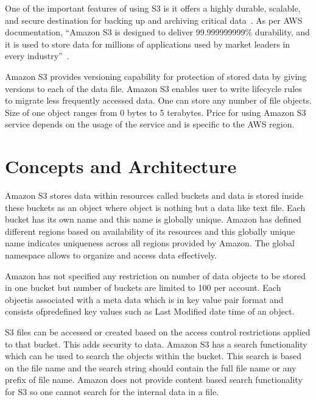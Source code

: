 One of the important features of using S3 is it offers a highly durable,
scalable, and secure destination for backing up and archiving critical
data~\cite{hid-sp18-420-amazon-S3}. As per AWS documentation, ``Amazon S3 is
designed to deliver 99.999999999\% durability, and it is used to store data for
millions of applications used by market leaders in every
industry''~\cite{hid-sp18-420-amazon-S3}.

Amazon S3 provides versioning capability for protection of stored data by giving
versions to each of the data file. Amazon S3 enables user to write lifecycle
rules to migrate less frequently accessed data. One can store any number of file
objects. Size of one object ranges from 0 bytes to 5 terabytes. Price for using
Amazon S3 service depends on the usage of the service and is specific to the AWS
region.



\section{Concepts and Architecture}


Amazon S3 stores data within resources called buckets and data is stored
inside these buckets as an object where object is nothing but a data like text
file.
Each bucket has its own name and this name is globally unique. Amazon has 
defined different regions based on availability of its resources and this 
globally unique name indicates uniqueness across all regions provided by 
Amazon. The global namespace allows to organize and access data effectively.

Amazon has not specified any restriction on number of data objects to be 
stored in one bucket but number of buckets are limited to 100 per account. 
Each objectis associated with a meta data which is in key value pair format 
and consists ofpredefined key values such as Last Modified date time of an
object.

S3 files can be accessed or created based on the access control restrictions 
applied to that bucket. This adds security to data. Amazon S3 has a search 
functionality which can be used to search the objects within the bucket. This 
search is based on the file name and the search string should contain the full 
file name or any prefix of file name. Amazon does not provide content based 
search functionality for S3 so one cannot search for the internal data in a 
file.





